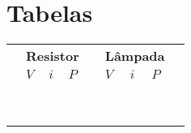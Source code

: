 \vfill
\pagebreak
\section{Tabelas}

\begin{table*}
	\begin{center}
		\begin{tabular}{lp{20mm}p{20mm}p{20mm}lp{20mm}p{20mm}p{20mm}l}
		\toprule
		& \multicolumn{3}{l}{\textbf{Resistor}} & & \multicolumn{3}{l}{\textbf{Lâmpada}} \\
		\cmidrule{2-4} \cmidrule{6-8}
		& $V$ & $i$ & $P$ & & $V$ & $i$ & $P$ \\
		\cmidrule{2-4} \cmidrule{6-8}
		& \cellcolor[gray]{0.89} & \cellcolor[gray]{0.92} & \cellcolor[gray]{0.89} & & \cellcolor[gray]{0.89} & \cellcolor[gray]{0.92} & \cellcolor[gray]{0.89} & \\
		& \cellcolor[gray]{0.95} & \cellcolor[gray]{0.97} & \cellcolor[gray]{0.95} & & \cellcolor[gray]{0.95} & \cellcolor[gray]{0.97} & \cellcolor[gray]{0.95} & \\
		& \cellcolor[gray]{0.89} & \cellcolor[gray]{0.92} & \cellcolor[gray]{0.89} & & \cellcolor[gray]{0.89} & \cellcolor[gray]{0.92} & \cellcolor[gray]{0.89} & \\
		& \cellcolor[gray]{0.95} & \cellcolor[gray]{0.97} & \cellcolor[gray]{0.95} & & \cellcolor[gray]{0.95} & \cellcolor[gray]{0.97} & \cellcolor[gray]{0.95} & \\
		& \cellcolor[gray]{0.89} & \cellcolor[gray]{0.92} & \cellcolor[gray]{0.89} & & \cellcolor[gray]{0.89} & \cellcolor[gray]{0.92} & \cellcolor[gray]{0.89} & \\
		& \cellcolor[gray]{0.95} & \cellcolor[gray]{0.97} & \cellcolor[gray]{0.95} & & \cellcolor[gray]{0.95} & \cellcolor[gray]{0.97} & \cellcolor[gray]{0.95} & \\
		& \cellcolor[gray]{0.89} & \cellcolor[gray]{0.92} & \cellcolor[gray]{0.89} & & \cellcolor[gray]{0.89} & \cellcolor[gray]{0.92} & \cellcolor[gray]{0.89} & \\
		& \cellcolor[gray]{0.95} & \cellcolor[gray]{0.97} & \cellcolor[gray]{0.95} & & \cellcolor[gray]{0.95} & \cellcolor[gray]{0.97} & \cellcolor[gray]{0.95} & \\
		& \cellcolor[gray]{0.89} & \cellcolor[gray]{0.92} & \cellcolor[gray]{0.89} & & \cellcolor[gray]{0.89} & \cellcolor[gray]{0.92} & \cellcolor[gray]{0.89} & \\

\end{tabular}
\end{center}
\end{table*}
